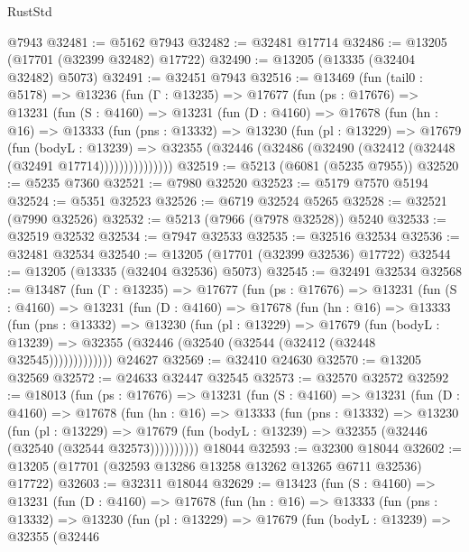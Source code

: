 \begin{lexlean}{RustStd}
\begin{coremodule}
    @7943
@32481 := @5162 @7943
@32482 := @32481 @17714
@32486 := @13205 (@17701 (@32399 @32482) @17722)
@32490 := @13205 (@13335 (@32404 @32482) @5073)
@32491 := @32451 @7943
@32516 := @13469
    (fun (tail0 : @5178) =>
    @13236
      (fun (Γ : @13235) =>
      @17677
        (fun (ps : @17676) =>
        @13231
          (fun (S : @4160) =>
          @13231
            (fun (D : @4160) =>
            @17678
              (fun (hn : @16) =>
              @13333
                (fun (pns : @13332) =>
                @13230
                  (fun (pl : @13229) =>
                  @17679
                    (fun (bodyL : @13239) =>
                    @32355 (@32446 (@32486 (@32490 (@32412 (@32448 (@32491 @17714)))))))))))))))
@32519 := @5213 (@6081 (@5235 @7955))
@32520 := @5235 @7360
@32521 := @7980 @32520
@32523 := @5179 @7570 @5194
@32524 := @5351 @32523
@32526 := @6719 @32524 @5265
@32528 := @32521 (@7990 @32526)
@32532 := @5213 (@7966 (@7978 @32528)) @5240
@32533 := @32519 @32532
@32534 := @7947 @32533
@32535 := @32516 @32534
@32536 := @32481 @32534
@32540 := @13205 (@17701 (@32399 @32536) @17722)
@32544 := @13205 (@13335 (@32404 @32536) @5073)
@32545 := @32491 @32534
@32568 := @13487
    (fun (Γ : @13235) =>
    @17677
      (fun (ps : @17676) =>
      @13231
        (fun (S : @4160) =>
        @13231
          (fun (D : @4160) =>
          @17678
            (fun (hn : @16) =>
            @13333
              (fun (pns : @13332) =>
              @13230
                (fun (pl : @13229) =>
                @17679
                  (fun (bodyL : @13239) =>
                  @32355 (@32446 (@32540 (@32544 (@32412 (@32448 @32545)))))))))))))
    @24627
@32569 := @32410 @24630
@32570 := @13205 @32569
@32572 := @24633 @32447 @32545
@32573 := @32570 @32572
@32592 := @18013
    (fun (ps : @17676) =>
    @13231
      (fun (S : @4160) =>
      @13231
        (fun (D : @4160) =>
        @17678
          (fun (hn : @16) =>
          @13333
            (fun (pns : @13332) =>
            @13230
              (fun (pl : @13229) =>
              @17679 (fun (bodyL : @13239) => @32355 (@32446 (@32540 (@32544 @32573))))))))))
    @18044
@32593 := @32300 @18044
@32602 := @13205 (@17701 (@32593 @13286 @13258 @13262 @13265 @6711 @32536) @17722)
@32603 := @32311 @18044
@32629 := @13423
    (fun (S : @4160) =>
    @13231
      (fun (D : @4160) =>
      @17678
        (fun (hn : @16) =>
        @13333
          (fun (pns : @13332) =>
          @13230
            (fun (pl : @13229) =>
            @17679
              (fun (bodyL : @13239) =>
              @32355
                (@32446

\end{coremodule}
\end{lexlean}

